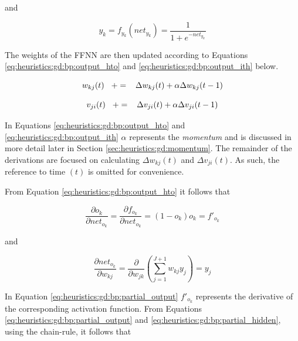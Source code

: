 and

\begin{equation}
      \label{eq:heuristics:gd:bp:output_2}
      y_{k} = f_{y_{k}}(net_{y_{k}}) = \frac{1}{1 + e^{-net_{y_{k}}}}
\end{equation}

The weights of the \ac{FFNN} are then updated according to Equations \ref{eq:heuristics:gd:bp:output_hto} and \ref{eq:heuristics:gd:bp:output_ith} below.

\begin{equation}
      \label{eq:heuristics:gd:bp:output_hto}
      w_{kj}(t) \hspace{3mm} += \hspace{3mm} \Delta w_{kj}(t) + \alpha \Delta w_{kj}(t - 1)
\end{equation}

\begin{equation}
      \label{eq:heuristics:gd:bp:output_ith}
      v_{ji}(t) \hspace{3mm} += \hspace{3mm} \Delta v_{ji}(t) + \alpha \Delta v_{ji}(t - 1)
\end{equation}

In Equations \ref{eq:heuristics:gd:bp:output_hto} and \ref{eq:heuristics:gd:bp:output_ith} $\alpha$ represents the \textit{momentum} and is discussed in more detail later in Section \ref{sec:heuristics:gd:momentum}. The remainder of the derivations are focused on calculating $\Delta w_{kj}(t)$ and $\Delta v_{ji}(t)$. As such, the reference to time $(t)$ is omitted for convenience.

From Equation \ref{eq:heuristics:gd:bp:output_hto} it follows that

\begin{equation}
      \label{eq:heuristics:gd:bp:partial_output}
      \frac{\partial o_{k}}{\partial net_{o_{k}}} = \frac{\partial f_{o_{k}}}{\partial net_{o_{k}}} = (1 - o_{k})o_{k} = f'_{o_{k}}
\end{equation}

and

\begin{equation}
      \label{eq:heuristics:gd:bp:partial_hidden}
      \frac{\partial net_{o_{k}}}{\partial w_{kj}} = \frac{\partial}{\partial w_{jk}}\left( \sum^{J+1}_{j=1}w_{kj}y_{j}\right) = y_{j}
\end{equation}

In Equation \ref{eq:heuristics:gd:bp:partial_output} $f'_{o_{k}}$ represents the derivative of the corresponding activation function. From Equations \ref{eq:heuristics:gd:bp:partial_output} and \ref{eq:heuristics:gd:bp:partial_hidden}, using the chain-rule, it follows that


